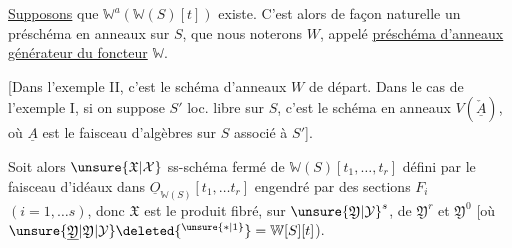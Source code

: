 \uline{Supposons} que $\mathbb W^a(\mathbb W(S)[t])$ existe. C'est alors de façon naturelle un préschéma en anneaux sur $S$, que nous noterons $W$, appelé \uline{préschéma d'anneaux générateur du foncteur} $\mathbb W$.

[Dans l'exemple II, c'est le schéma d'anneaux $W$ de départ. Dans le cas de l'exemple I,  si   on suppose $S'$  loc. libre sur $S$, c'est le  schéma en anneaux $V(\check{\underline A})$, où $\underline A$ est le faisceau d'algèbres sur $S$ associé à $S'$].

Soit alors $\unsure{\mathfrak X|\mathcal X}$ ss-schéma fermé de $\mathbb W(S)[t_1,\ldots,t_r]$ défini par  le faisceau d'idéaux dans  $\underline O_{\mathbb W(S)}[t_1,\ldots t_r]$ engendré par des sections $F_i$ $(i=1,\ldots s)$, donc $\mathfrak X$ est le produit fibré, sur $\unsure{\mathfrak Y|\mathcal Y}^s$, de $\mathfrak Y^r$ et $\mathfrak Y^0$ [où $\unsure{\underline{\mathfrak Y}|\mathfrak Y|\mathcal Y}\deleted{^{\unsure{*|1}}}=\mathbb W[S][t]$).
